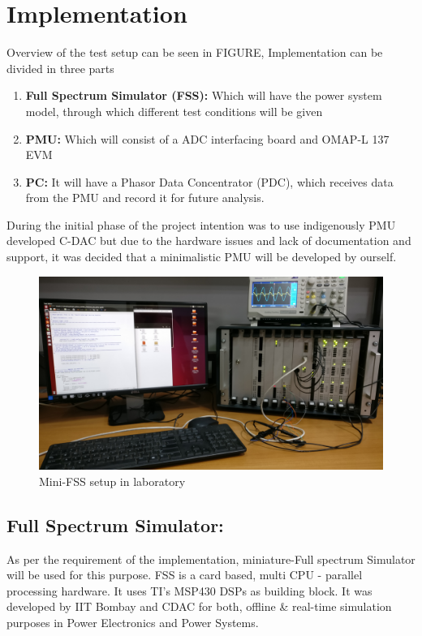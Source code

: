 \section{Implementation}
Overview of the test setup can be seen in FIGURE, Implementation can be divided in three parts
\begin{enumerate}
\item \textbf{Full Spectrum Simulator (FSS):} Which will have the power system model, through which different test conditions will be given
\item \textbf{PMU:} Which will consist of a ADC interfacing board and OMAP-L 137 EVM
\item \textbf{PC:} It will have a Phasor Data Concentrator (PDC), which receives data from the PMU and record it for future analysis.
\end{enumerate}
During the initial phase of the project intention was to use indigenously PMU developed C-DAC but due to the hardware issues and lack of documentation and support, it was decided that a minimalistic PMU will be developed by ourself.

\begin{figure}[th]
\centering
\includegraphics[width=\textwidth]{fig/FSS_setup.jpg}
\caption{Mini-FSS setup in laboratory}
\label{fig:fss_setup}
\end{figure}

\subsection{Full Spectrum Simulator:}
As per the requirement of the implementation, miniature-Full spectrum Simulator will be used for this purpose. FSS is a card based, multi CPU - parallel processing hardware. It uses TI's MSP430 DSPs as building block. It was developed by IIT Bombay and CDAC for both, offline \& real-time  simulation purposes in Power Electronics and Power Systems.

